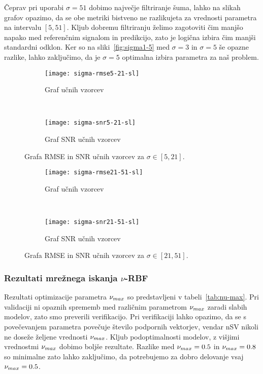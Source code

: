 Čeprav pri uporabi $\sigma=51$ dobimo največje filtriranje šuma, lahko na slikah grafov opazimo, da se obe metriki bistveno ne razlikujeta za vrednosti parametra na intervalu $[5,51]$. Kljub dobremu filtriranju želimo zagotoviti čim manjšo napako med referenčnim signalom in predikcijo, zato je logična izbira čim manjši standardni odklon. Ker so na sliki~\ref{fig:sigma1-5} med $\sigma=3$ in $\sigma=5$ še opazne razlike, lahko zaključimo, da je $\sigma=5$ optimalna izbira parametra za naš problem. 


\begin{figure}[!htb]
	\centering
	\begin{subfigure}[t]{0.45\columnwidth}
		\texttt{[image: sigma-rmse5-21-sl]}
		\caption{Graf \rmse  učnih vzorcev}
		\label{fig:sigma-rmse5-21}
	\end{subfigure}
	~
	\begin{subfigure}[t]{0.45\columnwidth}
		\texttt{[image: sigma-snr5-21-sl]}
		\caption{Graf SNR  učnih vzorcev}
		\label{fig:sigma-snr5-21}
	\end{subfigure}
	\caption[Grafa \rmse in SNR učnih vzorcev za \mbox{$\sigma \in [5,21]$}]{Grafa RMSE in SNR učnih vzorcev za \mbox{$\sigma \in [5,21]$}.}
	\label{fig:sigma5-21}
\end{figure}



\begin{figure}[!htb]
	\centering
	\begin{subfigure}[t]{0.45\columnwidth}
		\texttt{[image: sigma-rmse21-51-sl]}
		\caption{Graf \rmse učnih vzorcev}
		\label{fig:sigma-rmse21-51}
	\end{subfigure}
	~
	\begin{subfigure}[t]{0.45\columnwidth}
		\texttt{[image: sigma-snr21-51-sl]}
		\caption{Graf SNR  učnih vzorcev}
		\label{fig:sigma-snr21-51}
	\end{subfigure}
	\caption[Grafa \rmse in SNR učnih vzorcev za \mbox{$\sigma \in [21,51]$}]{Grafa RMSE in SNR učnih vzorcev za \mbox{$\sigma \in [21,51]$}.}
	\label{fig:sigma21-51}
\end{figure}


\subsubsection{Rezultati mrežnega iskanja \texorpdfstring{$\nu$}{nu}-RBF}
Rezultati optimizacije parametra $\nu_{max}$ so predstavljeni v tabeli~\ref{tab:nu-max}. Pri validaciji ni opaznih sprememb med različnim parametrom $\nu_{max}$ zaradi slabih modelov, zato smo preverili verifikacijo. Pri verifikaciji lahko opazimo, da se s povečevanjem parametra povečuje število podpornih vektorjev, vendar nSV nikoli ne doseže željene vrednosti $\nu_{max}$. Kljub podoptimalnosti modelov, z višjimi vrednostmi $\nu_{max}$ dobimo boljše rezultate. Razlike med $\nu_{max}=0.5$ in $\nu_{max}=0.8$ so minimalne zato lahko zaključimo, da potrebujemo za dobro delovanje vsaj $\nu_{max}=0.5$. 

